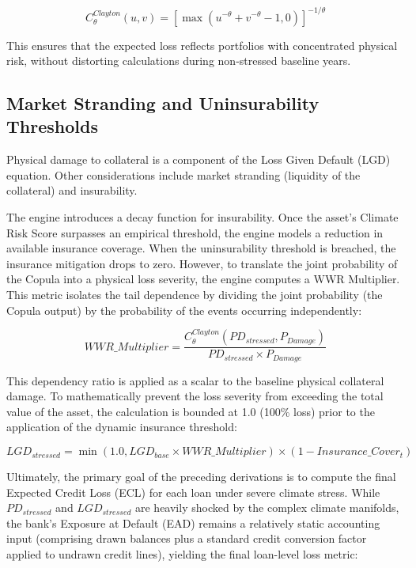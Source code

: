 \documentclass[11pt]{article}
\begin{document}
\begin{equation}
C^{Clayton}_{\theta}(u, v) = \left[ \max(u^{-\theta} + v^{-\theta} - 1, 0) \right]^{-1/\theta}
\end{equation}

This ensures that the expected loss reflects portfolios with concentrated physical risk, without distorting calculations during non-stressed baseline years.

\subsection{Market Stranding and Uninsurability Thresholds}
Physical damage to collateral is a component of the Loss Given Default (LGD) equation. Other considerations include market stranding (liquidity of the collateral) and insurability.

The engine introduces a decay function for insurability. Once the asset's Climate Risk Score surpasses an empirical threshold, the engine models a reduction in available insurance coverage. When the uninsurability threshold is breached, the insurance mitigation drops to zero. However, to translate the joint probability of the Copula into a physical loss severity, the engine computes a WWR Multiplier. This metric isolates the tail dependence by dividing the joint probability (the Copula output) by the probability of the events occurring independently:

\begin{equation}
WWR\_Multiplier = \frac{C^{Clayton}_{\theta}(PD_{stressed}, P_{Damage})}{PD_{stressed} \times P_{Damage}}
\end{equation}

This dependency ratio is applied as a scalar to the baseline physical collateral damage. To mathematically prevent the loss severity from exceeding the total value of the asset, the calculation is bounded at 1.0 (100\% loss) prior to the application of the dynamic insurance threshold:

\begin{equation}
LGD_{stressed} = \min(1.0, LGD_{base} \times WWR\_Multiplier) \times (1 - Insurance\_Cover_t)
\end{equation}

Ultimately, the primary goal of the preceding derivations is to compute the final Expected Credit Loss (ECL) for each loan under severe climate stress. While $PD_{stressed}$ and $LGD_{stressed}$ are heavily shocked by the complex climate manifolds, the bank's Exposure at Default (EAD) remains a relatively static accounting input (comprising drawn balances plus a standard credit conversion factor applied to undrawn credit lines), yielding the final loan-level loss metric:
\end{document}

